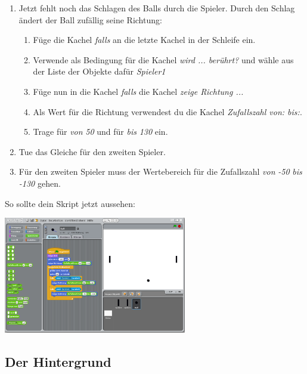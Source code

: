 \begin{enumerate}
\begin{enumerate}
\item Jetzt fehlt noch das Schlagen des Balls durch die Spieler. Durch den Schlag ändert der Ball zufällig seine Richtung:
\begin{enumerate}
\item Füge die Kachel \textit{falls} an die letzte Kachel in der Schleife ein.
\item Verwende als Bedingung für die Kachel \textit{wird ... berührt?} und wähle aus der Liste der Objekte dafür \emph{Spieler1}
\item Füge nun in die Kachel \textit{falls} die Kachel \textit{zeige Richtung ...}
\item Als Wert für die Richtung verwendest du die Kachel \textit{Zufallszahl von: bis:}.
\item Trage für \emph{von} \emph{50} und für \emph{bis} \emph{130} ein.
\end{enumerate}
\item Tue das Gleiche für den zweiten Spieler.
\item Für den zweiten Spieler muss der Wertebereich für die Zufallszahl \emph{von} \emph{-50}  \emph{bis} \emph{-130} gehen. 
\end{enumerate}
\end{enumerate}

So sollte dein Skript jetzt aussehen: 

\includegraphics[width=0.6\textwidth]{images/aufgabe5_pong_sprite_ball_1.png}


\subsection{Der Hintergrund}

